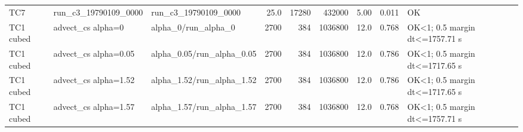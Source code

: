 \begin{table}[htbp]
\begin{tabular}{lllrrrrrl}
TC7 & run\_c3\_19790109\_0000 & run\_c3\_19790109\_0000 & 25.0 & 17280 & 432000 & 5.00 & 0.011 & OK \\
TC1 cubed & advect\_cs alpha=0 & alpha\_0/run\_alpha\_0 & 2700 & 384 & 1036800 & 12.0 & 0.768 & OK<1; 0.5 margin dt<=1757.71 s \\
TC1 cubed & advect\_cs alpha=0.05 & alpha\_0.05/run\_alpha\_0.05 & 2700 & 384 & 1036800 & 12.0 & 0.786 & OK<1; 0.5 margin dt<=1717.65 s \\
TC1 cubed & advect\_cs alpha=1.52 & alpha\_1.52/run\_alpha\_1.52 & 2700 & 384 & 1036800 & 12.0 & 0.786 & OK<1; 0.5 margin dt<=1717.65 s \\
TC1 cubed & advect\_cs alpha=1.57 & alpha\_1.57/run\_alpha\_1.57 & 2700 & 384 & 1036800 & 12.0 & 0.768 & OK<1; 0.5 margin dt<=1757.71 s \\
\bottomrule
\end{tabular}
\end{table}
